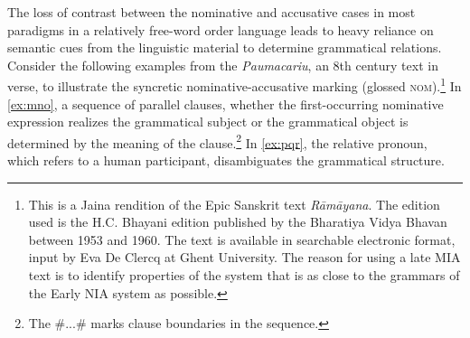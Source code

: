 \documentclass[output=paper,
modfonts
]{LSP/langsci}
\begin{document}
 
 The loss of contrast between the nominative and accusative cases in most paradigms in a relatively free-word order language leads to heavy reliance on semantic cues from the linguistic material to determine grammatical relations. Consider the following examples from the \textit{Paumacariu}, an 8th century text in verse, to illustrate the syncretic nominative-accusative marking (glossed \textsc{nom}).\footnote{This is a Jaina rendition
of the Epic Sanskrit text  \textit{Rāmāyana}. The edition used is the H.C. Bhayani edition published by the Bharatiya Vidya Bhavan
between 1953 and 1960. The text is available in searchable electronic format, input by Eva De
Clercq at Ghent University. The reason for using a late MIA text is to identify properties of the system that is as  close to the grammars of the Early NIA system as possible.} In \cref{ex:mno}, a sequence of parallel clauses, whether the first-occurring nominative expression realizes the grammatical subject or the grammatical  object  is determined by the meaning of the clause.\footnote{The \#...\# marks clause boundaries in the sequence.} In \cref{ex:pqr}, the relative pronoun, which refers to a human participant, disambiguates the grammatical structure. 
\end{document}
